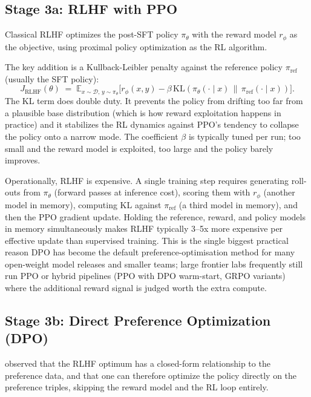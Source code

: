 \subsection{Stage 3a: RLHF with PPO}

Classical RLHF \citep{christiano2017deep, ouyang2022training}
optimizes the post-SFT policy $\pi_\theta$ with the reward model
$r_\phi$ as the objective, using proximal policy optimization
\citep{schulman2017ppo} as the RL algorithm.

The key addition is a Kullback-Leibler penalty against the
reference policy $\pi_\text{ref}$ (usually the SFT policy):
\begin{equation}
  J_\text{RLHF}(\theta)
  \;=\;
  \mathbb{E}_{x \sim \mathcal{D},\, y \sim \pi_\theta}
  \Big[
    r_\phi(x, y) - \beta\, \mathrm{KL}\!\left(\pi_\theta(\cdot \mid x)\,\|\, \pi_\text{ref}(\cdot \mid x)\right)
  \Big].
  \label{eq:rlhf}
\end{equation}
The KL term does double duty. It prevents the policy from drifting
too far from a plausible base distribution (which is how reward
exploitation happens in practice) and it stabilizes the RL dynamics
against PPO's tendency to collapse the policy onto a narrow mode.
The coefficient $\beta$ is typically tuned per run; too small and
the reward model is exploited, too large and the policy barely
improves.

Operationally, RLHF is expensive. A single training step requires
generating roll-outs from $\pi_\theta$ (forward passes at inference
cost), scoring them with $r_\phi$ (another model in memory),
computing KL against $\pi_\text{ref}$ (a third model in memory), and
then the PPO gradient update. Holding the reference, reward, and
policy models in memory simultaneously makes RLHF typically 3--5x
more expensive per effective update than supervised training. This
is the single biggest practical reason DPO has become the default
preference-optimisation method for many open-weight model releases
and smaller teams; large frontier labs frequently still run PPO or
hybrid pipelines (PPO with DPO warm-start, GRPO variants) where
the additional reward signal is judged worth the extra compute.

\subsection{Stage 3b: Direct Preference Optimization (DPO)}

\citet{rafailov2023direct} observed that the RLHF optimum has a
closed-form relationship to the preference data, and that one can
therefore optimize the policy directly on the preference triples,
skipping the reward model and the RL loop entirely.


